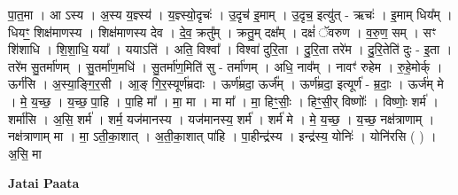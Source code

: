 \documentclass[17pt]{extarticle}
\begin{document}
पा॒त॒मा । आ ऽस्य । अ॒स्य य॒ज्ञ्स्य॑ । य॒ज्ञ्स्यो॒दृचः॑ । उ॒दृच॑ इ॒माम् । उ॒दृच॒ इत्यु॑त् - ऋचः॑ । इ॒माम् धिय᳚म् । धियꣳ॒॒ शिक्ष॑माणस्य । शिक्ष॑माणस्य देव । दे॒व॒ क्रतु᳚म् । क्रतु॒म् दक्ष᳚म् । दक्षं॑ ॅवरुण । व॒रु॒ण॒ सम् । सꣳ शि॑शाधि । शि॒शा॒धि॒ यया᳚ । ययाऽति॑ । अति॒ विश्वा᳚ । विश्वा॑ दुरि॒ता । दु॒रि॒ता तरे॑म । दु॒रि॒तेति॑ दुः - इ॒ता । तरे॑म सु॒तर्मा॑णम् । सु॒तर्मा॑ण॒मधि॑ । सु॒तर्मा॑ण॒मिति॑ सु - तर्मा॑णम् । अधि॒ नाव᳚म् । नावꣳ॑ रुहेम । रु॒हे॒मोर्क् । ऊर्ग॑सि । अ॒स्या॒ङ्गि॒र॒सी । आ॒ङ् गि॒र॒स्यूर्ण॑म्रदाः । ऊर्ण॑म्रदा॒ ऊर्ज᳚म् । ऊर्ण॑म्रदा॒ इत्यूर्ण॑ - म्र॒दाः॒ । ऊर्ज॑म् मे । मे॒ य॒च्छ॒ । य॒च्छ॒ पा॒हि । पा॒हि मा᳚ । मा॒ मा । मा मा᳚ । मा॒ हिꣳ॒॒सीः॒ । हिꣳ॒॒सी॒र् विष्णोः᳚ । विष्णोः॒ शर्म॑ । शर्मा॑सि । अ॒सि॒ शर्म॑ । शर्म॒ यज॑मानस्य । यज॑मानस्य॒ शर्म॑ । शर्म॑ मे । मे॒ य॒च्छ॒ । य॒च्छ॒ नक्ष॑त्राणाम् । नक्ष॑त्राणाम् मा । मा॒ ऽती॒का॒शात् । अ॒ती॒का॒शात् पा॑हि । पा॒हीन्द्र॑स्य । इन्द्र॑स्य॒ योनिः॑ । योनि॑रसि ( ) । अ॒सि॒ मा \newline

\textbf{Jatai Paata} \newline
\end{document}
